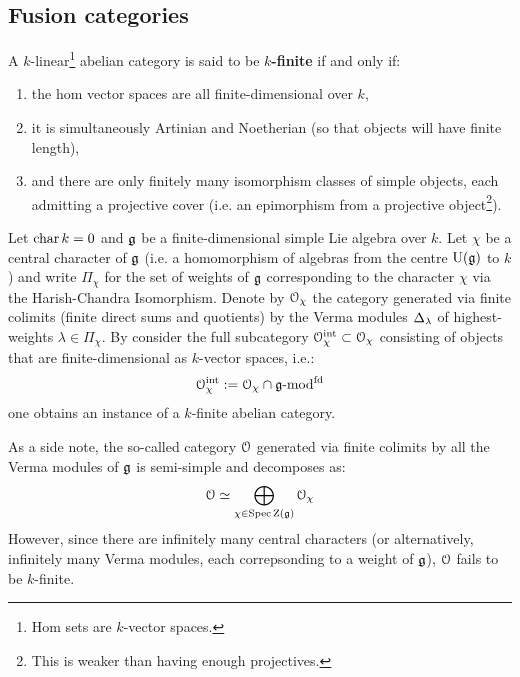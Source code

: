         \subsection{Fusion categories}
            \begin{definition} \label{def: finite_linear_categories}
                A $k$-linear\footnote{Hom sets are $k$-vector spaces.} abelian category is said to be \textbf{$k$-finite} if and only if:
                \begin{enumerate}
                    \item the hom vector spaces are all finite-dimensional over $k$,
                    \item it is simultaneously Artinian and Noetherian (so that objects will have finite length),
                    \item and there are only finitely many isomorphism classes of simple objects, each admitting a projective cover (i.e. an epimorphism from a projective object\footnote{This is weaker than having enough projectives.}).
                \end{enumerate}
            \end{definition}
            \begin{example}
                Let $\operatorname{char} k = 0$ and $\mathfrak{g}$ be a finite-dimensional simple Lie algebra over $k$. Let $\chi$ be a central character of $\mathfrak{g}$ (i.e. a homomorphism of algebras from the centre $\mathrm{U}(\mathfrak{g})$ to $k$) and write $\Pi_{\chi}$ for the set of weights of $\mathfrak{g}$ corresponding to the character $\chi$ via the Harish-Chandra Isomorphism. Denote by $\mathcal{O}_{\chi}$ the category generated via finite colimits (finite direct sums and quotients) by the Verma modules $\Delta_{\lambda}$ of highest-weights $\lambda \in \Pi_{\chi}$. By consider the full subcategory $\mathcal{O}_{\chi}^{\mathrm{int}} \subset \mathcal{O}_{\chi}$ consisting of objects that are finite-dimensional as $k$-vector spaces, i.e.:
                    $$\mathcal{O}_{\chi}^{\mathrm{int}} := \mathcal{O}_{\chi} \cap \mathfrak{g}\text{-}\mathrm{mod}^{\mathrm{fd}}$$
                one obtains an instance of a $k$-finite abelian category.

                As a side note, the so-called category $\mathcal{O}$ generated via finite colimits by all the Verma modules of $\mathfrak{g}$ is semi-simple and decomposes as:
                    $$\mathcal{O} \simeq \bigoplus_{\chi \in \operatorname{Spec} \mathrm{Z}(\mathfrak{g})} \mathcal{O}_{\chi}$$
                However, since there are infinitely many central characters (or alternatively, infinitely many Verma modules, each correpsonding to a weight of $\mathfrak{g}$), $\mathcal{O}$ fails to be $k$-finite. 
            \end{example}
